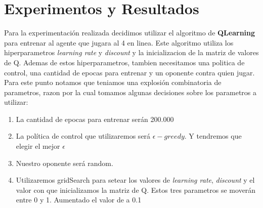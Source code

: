 \section{Experimentos y Resultados}
%
%
%
%
%

Para la experimentación realizada decidimos utilizar el algoritmo de \textbf{QLearning} para entrenar al agente que jugara
al 4 en linea. Este algoritmo utiliza los hiperparametros \textit{learning rate} y \textit{discount} y la inicializacion
 de la matriz de valores de Q. Ademas de estos hiperparametros, tambien necesitamos una politica de control, una cantidad
  de epocas para entrenar y un oponente contra quien jugar.  \\

Para este punto notamos que teniamos una explosión combinatoria de parametros, razon por la cual tomamos algunas decisiones
sobre los parametros a utilizar:

\begin{enumerate}
\item La cantidad de epocas para entrenar serán 200.000
\item La política de control que utilizaremos será \textbf{$\epsilon-greedy$}. Y tendremos que elegir el mejor $\epsilon$
\item Nuestro oponente será random.
\item Utilizaremos gridSearch para setear los valores de \textit{learning rate},  \textit{discount} y el valor con que
inicializamos la matriz de Q. Estos tres parametros se moverán entre 0 y 1. Aumentado el valor de a 0.1
\end{enumerate}


